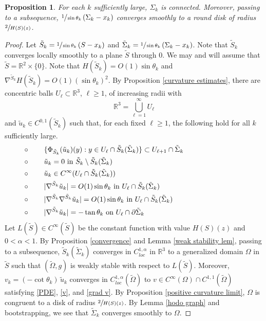 \documentclass[11pt]{amsart}
\newtheorem{prop}{Proposition}
\begin{document}
\begin{prop} \label{blowup} For each $k$ sufficiently large, $\Sigma_k$ is connected. Moreover, passing to a subsequence, $\sfrac{1}{\sin\theta_k}\,(\Sigma_k-x_k)$ converges smoothly to a round disk of radius $\sfrac{2}{H(S)(z)}$.
\end{prop}
\begin{proof}
Let $\tilde S_k=\sfrac1{\sin\theta_k}\,(S-x_k)$ and $\tilde \Sigma_k= \sfrac1{\sin\theta_k}\,(\Sigma_k-x_k)$. Note that $\tilde S_k$ converges locally smoothly to a  plane $\tilde S$ through $0$. We may and will assume that $\tilde S=\mathbb{R}^2\times \{0\}$. Note that $H(\tilde S_k)=O(1)\sin\theta_k$ and $\nabla^{\tilde S_k}H(\tilde S_k)=O(1)(\sin\theta_k)^2$. By Proposition \ref{curvature estimates}, 
	 there are
	concentric balls $U_\ell\subset \mathbb{R}^3$, $\ell \geq 1$, of increasing radii with 
	$$
	\mathbb{R}^3=\bigcup_{\ell=1}^\infty U_\ell
	$$
	and 	$\tilde u_k\in C^{0,1}(\tilde S_k)$  such that, for each fixed $\ell \geq 1$,  the following hold for all $k$  sufficiently large.
	\begin{align*}
		&\circ\qquad  \text{$\{\Phi_{\tilde S_k}(\tilde u_k)(y):y\in U_{\ell}\cap  \tilde S_k(\tilde \Sigma_k)\}\subset U_{\ell+1}\cap \tilde \Sigma_k$}\hspace{3cm}\\ 		
		&\circ\qquad \text{$\tilde u_k=0$ in $\tilde S_k\setminus \tilde S_k(\tilde \Sigma_k)$} \\
		&\circ\qquad \text{$\tilde  u_k\in C^\infty(U_{\ell}\cap \tilde S_k(\tilde \Sigma_k))$}\\ 
		&\circ\qquad \text{$|\nabla^{\tilde S_k}\tilde  u_k|=O(1) \sin\theta_k$ in $ U_{\ell}\cap \tilde S_k(\tilde \Sigma_k)$}\\ 
		&\circ\qquad \text{$|\nabla^{\tilde S_k}\nabla^{\tilde S_k} \tilde u_k|=O(1)\sin\theta_k$ in $U_{\ell}\cap   \tilde S_k(\tilde \Sigma_k)$}\\ 
		&\circ\qquad \text{$|\nabla^{\tilde S_k} \tilde u_k|=-\tan\theta_k$ on $U_{\ell}\cap \partial \tilde \Sigma_k$}
	\end{align*}
	Let $L(\tilde S)\in C^\infty(\tilde S)$ be the constant function with value $H(S)(z)$ and $0<\alpha<1$. 	By Proposition \ref{convergence} and Lemma \ref{weak stability lem}, passing to a subsequence, $\tilde S_k(\tilde \Sigma_k)$ converges in $C_{loc}^{1,\alpha}$  in $\mathbb{R}^3$ to a   generalized domain $\Omega$ in $\tilde S$ such that $(\tilde \Omega,g)$ is weakly stable with respect to $L(\tilde S)$. Moreover, $v_k=(-\cot\theta_k)\,\tilde u_k$ converges  in $C_{loc}^{1,\alpha}(\tilde \Omega)$ to $v\in C^\infty(\Omega)\cap C^{1,1}(\tilde \Omega)$ satisfying \eqref{PDE}, \eqref{v}, and \eqref{grad v}. By Proposition \ref{positive curvature limit},  $\Omega$ is congruent to a disk of radius $\sfrac{2}{H(S)(z)}$. By Lemma \ref{hodo graph} and bootstrapping, we see that $\tilde \Sigma_k$ converges  smoothly to $ \Omega$.
	

\end{proof}
\end{document}
